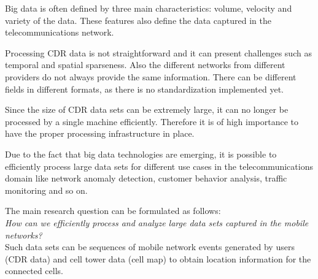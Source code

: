 Big data is often defined by three main characteristics: volume, velocity and variety of the data. These features also define the data captured in the telecommunications network.

Processing CDR data is not straightforward and it can present challenges such as temporal and spatial sparseness. Also the different networks from different providers do not always provide the same information. There can be different fields in different formats, as there is no standardization implemented yet. 

Since the size of CDR data sets can be extremely large, it can no longer be processed by a single machine efficiently. Therefore it is of high importance to have the proper processing infrastructure in place.  

Due to the fact that big data technologies are emerging, it is possible to efficiently process large data sets for different use cases in the telecommunications domain like network anomaly detection, customer behavior analysis, traffic monitoring and so on.

The main research question can be formulated as follows:\\

\textit{How can we efficiently process and analyze large data sets captured in the mobile networks?}\\

Such data sets can be sequences of mobile network events generated by users (CDR data) and cell tower data (cell map) to obtain location information for the connected cells.






